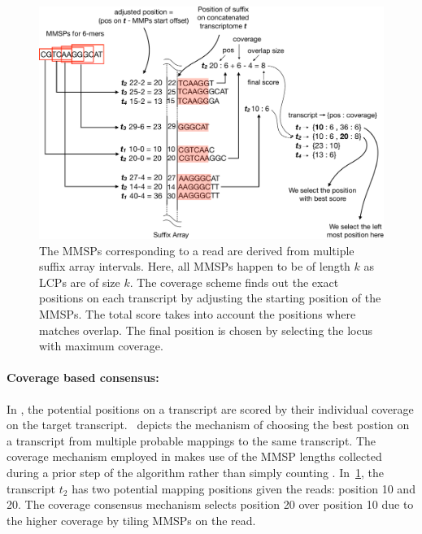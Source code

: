 \begin{figure}
 \centering
 \includegraphics[scale=0.25]{Figures/sla/max_cov-color}
 \caption[Choosing the best postion on a transcript from multiple candidates]{The MMSPs corresponding to a read 
 are derived from multiple suffix array intervals. Here, all MMSPs happen to be of length $k$ as LCPs are of 
 size $k$. The coverage scheme finds out the exact positions on each transcript by adjusting the starting position of the MMSPs. The total score takes into account the positions where matches overlap. The final position is chosen by selecting the locus with maximum coverage.}
\label{fig:maxCov}
\end{figure}

\paragraph{Coverage based consensus:}
In \sla, the potential positions on a transcript are scored by their individual coverage on the target transcript.~ depicts the mechanism of choosing the best postion on a transcript from multiple probable mappings to the same transcript. The coverage mechanism employed in \sla makes use of the MMSP lengths collected during a prior step of the algorithm rather than simply counting \kmers. In~\cref{fig:maxCov}, the transcript $t_2$ has two potential mapping positions given the reads: position 10 and 20. The coverage consensus mechanism selects position 20 over position 10 due to the higher coverage by tiling MMSPs on the read.

